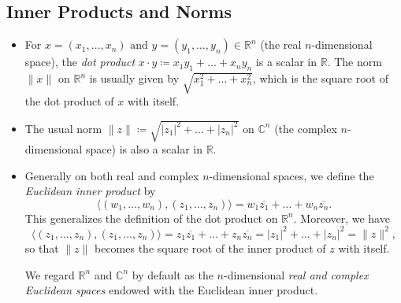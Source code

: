 \documentclass{article}
\newcommand{\R}{\mathbb{R}}
\newcommand{\C}{\mathbb{C}}
\newcommand{\conj}[1]{\overline{#1}}
\newcommand{\inp}[2]{\langle #1, #2 \rangle}
\begin{document}
\subsection{Inner Products and Norms}
\begin{itemize}
    \item For $x=(x_1,\dots,x_n) \text{ and } y=(y_1,\dots,y_n) \in \R^n$ (the real $n$-dimensional space), the \textit{dot product} $x \cdot y \coloneqq x_1y_1+\dots+x_ny_n$ is a scalar in $\R$. The norm $\|x\|$ on $\R^n$ is usually given by $\sqrt{x_1^2+\dots+x_n^2}$, which is the square root of the dot product of $x$ with itself.
    \item The usual norm $\|z\| \coloneqq  \sqrt{|z_1|^2+\dots+|z_n|^2}$ on $\C^n$ (the complex $n$-dimensional space) is also a scalar in $\R$.
    \item Generally on both real and complex $n$-dimensional spaces, we define the \textit{Euclidean inner product} by $$\inp{(w_1,\dots,w_n)}{(z_1,\dots,z_n)} =  w_1\conj{z_1}+\dots+w_n\conj{z_n}.$$ This generalizes the definition of the dot product on $\R^n$. Moreover, we have $$\inp{(z_1,\dots,z_n)}{(z_1,\dots,z_n)} = z_1\conj{z_1}+\dots+z_n\conj{z_n} = |z_1|^2 + \dots + |z_n|^2 = \|z\|^2,$$ so that $\|z\|$ becomes the square root of the inner product of $z$ with itself.
    
    We regard $\R^n$ and $\C^n$ by default as the $n$-dimensional \textit{real and complex Euclidean spaces} endowed with the Euclidean inner product. 
    

\end{itemize}
\end{document}
